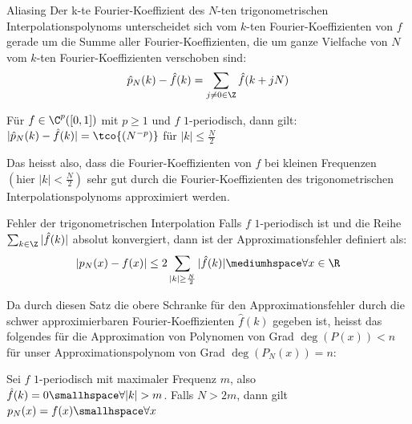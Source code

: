\begin{theorem}[]{Aliasing}
    Der k-te Fourier-Koeﬃzient des $N$-ten trigonometrischen Interpolationspolynoms unterscheidet sich vom $k$-ten Fourier-Koeffizienten von $f$ 
    gerade um die Summe aller Fourier-Koeffizienten, die um ganze Vielfache von $N$ vom $k$-ten Fourier-Koeffizienten verschoben sind:
    \begin{align*}
        \hat{p}_N(k) - \hat{f}(k) = \sum_{j \neq 0 \in \Z} \hat{f}(k + jN)
    \end{align*}
\end{theorem}

\inlinecorollary Für $f \in \C^p([0, 1])$ mit $p \geq 1$ und $f$ $1$-periodisch, dann gilt: $|\hat{p}_N(k) - \hat{f}(k)| = \tco{(N^{-p})}$ für $|k| \leq \frac{N}{2}$

Das heisst also, dass die Fourier-Koeffizienten von $f$ bei kleinen Frequenzen $\left( \text{hier } |k| < \frac{N}{2} \right)$
sehr gut durch die Fourier-Koeffizienten des trigonometrischen Interpolationspolynoms approximiert werden.

\begin{theorem}[]{Fehler der trigonometrischen Interpolation}
    Falls $f$ $1$-periodisch ist und die Reihe $\sum_{k \in \Z} |\hat{f}(k)|$ absolut konvergiert, dann ist der Approximationsfehler definiert als:
    \begin{align*}
        |p_N(x) - f(x)| \leq 2 \sum_{|k| \geq \frac{N}{2}} |\hat{f}(k)| \mediumhspace \forall x \in \R
    \end{align*}
\end{theorem}
Da durch diesen Satz die obere Schranke für den Approximationsfehler durch die schwer approximierbaren Fourier-Koeffizienten $\hat{f}(k)$ gegeben ist,
heisst das folgendes für die Approximation von Polynomen von Grad $\deg(P(x)) < n$ für unser Approximationspolynom von Grad $\deg(P_N(x)) = n$:

 Sei $f$ $1$-periodisch mit maximaler Frequenz $m$, also $\hat{f}(k) = 0 \smallhspace \forall |k| > m$. Falls $N > 2m$, dann gilt $p_N(x) = f(x) \smallhspace \forall x$

